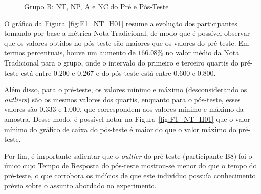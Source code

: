 \begin{figure}[htb]
{
	}
	\captionsetup{justification=centering}
	\caption{Grupo B: NT, NP, A e NC do Pré e Pós-Teste}
	\label{fig:F1_H01}
\end{figure}

O gráfico da Figura~\ref{fig:F1_NT_H01} resume a evolução dos participantes tomando por base a métrica Nota Tradicional, de modo que é possível observar que os valores obtidos no pós-teste são maiores que os valores do pré-teste. Em termos percentuais, houve um aumento de $166.08\%$ no valor médio da Nota Tradicional para o grupo, onde o intervalo do primeiro e terceiro quartis do pré-teste está entre $0.200$ e $0.267$ e do pós-teste está entre $0.600$ e $0.800$.

Além disso, para o pré-teste, os valores mínimo e máximo (desconsiderando os \textit{outliers}) são os mesmos valores dos quartis, enquanto para o pós-teste, esses valores são $0.333$ e $1.000$, que correspondem aos valores mínimo e máximo da amostra. Desse modo, é possível notar na Figura~\ref{fig:F1_NT_H01} que o valor mínimo do gráfico de caixa do pós-teste é maior do que o valor máximo do pré-teste.

Por fim, é importante salientar que o \textit{outlier} do pré-teste (participante B8) foi o único cujo Tempo de Resposta do pós-teste mostrou-se menor do que o tempo do pré-teste, o que corrobora os indícios de que este indivíduo possuía conhecimento prévio sobre o assunto abordado no experimento.

